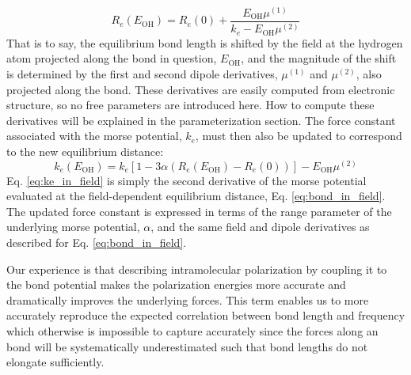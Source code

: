 \documentclass[journal=jacsat,manuscript=article]{achemso}
\begin{document}
\begin{equation}
  R_e(E_\mathrm{OH})=R_e(0) + \frac{E_\mathrm{OH}\mu^{(1)}}{k_e-E_\mathrm{OH}\mu^{(2)}}
  \label{eq:bond_in_field}
\end{equation}
\noindent
That is to say, the equilibrium bond length is shifted by the field at the hydrogen atom projected along the
bond in question, $E_\mathrm{OH}$, and the magnitude of the shift is determined by the
first and second dipole derivatives, $\mu^{(1)}$ and $\mu^{(2)}$, also projected along the  bond.
These derivatives are easily computed from electronic structure, so no free parameters are introduced here.
How to compute these derivatives will be explained in the parameterization section.
The force constant associated with the morse potential, $k_e$, must then also be updated
to correspond to the new equilibrium distance:
\begin{equation}
  k_e(E_\mathrm{OH})=k_e[1-3\alpha(R_e(E_\mathrm{OH})-R_e(0))]-E_\mathrm{OH}\mu^{(2)}
  \label{eq:ke_in_field}
\end{equation}
\noindent
Eq. \ref{eq:ke_in_field} is simply the second derivative of the morse potential evaluated
at the field-dependent equilibrium distance, Eq. \ref{eq:bond_in_field}. The updated force
constant is expressed in terms of the range parameter of the underlying morse potential, $\alpha$,
and the same field and dipole derivatives as described for Eq. \ref{eq:bond_in_field}.

Our experience is that describing intramolecular polarization by coupling it to the bond potential
makes the polarization energies more accurate and dramatically improves the underlying forces.
This term enables us to more accurately reproduce the expected correlation between bond length and
frequency which otherwise is impossible to capture accurately since the forces along an 
bond will be systematically underestimated such that bond lengths do not elongate sufficiently.
\end{document}

